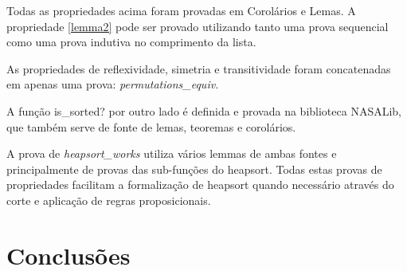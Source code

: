 Todas as propriedades acima foram provadas em Corolários e Lemas. A propriedade \ref{lemma2} pode ser provado utilizando tanto uma prova sequencial como uma prova indutiva no comprimento da lista. 

As propriedades de reflexividade, simetria e transitividade foram concatenadas em apenas uma prova: \textit{permutations\_equiv}.

A função is\_sorted? por outro lado é definida e provada na biblioteca NASALib, que também serve de fonte de lemas, teoremas e corolários.

A prova de \textit{heapsort\_works} utiliza vários lemmas de ambas fontes e principalmente de provas das sub-funções do heapsort. Todas estas provas de propriedades facilitam a formalização de heapsort quando necessário através do corte e aplicação de regras proposicionais.

\chapter{Conclusões}
